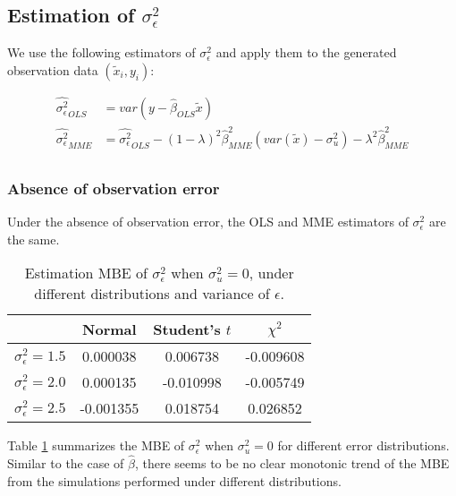 \documentclass{article}
\begin{document}
\subsection{Estimation of $\sigma^2_\epsilon$}

We use the following estimators of $\sigma^2_\epsilon$ and apply them to the generated observation data $(\tilde{x}_i, y_i)$:

\begin{equation}
    \begin{split}
        \hat{\sigma^2_\epsilon}_{OLS} &= var\left(y - \hat{\beta}_{OLS} \tilde{x}\right)\\
        \hat{\sigma^2_\epsilon}_{MME} &= \hat{\sigma^2_\epsilon}_{OLS} -  (1-\lambda)^2 \hat{\beta}_{MME}^2 (var(\tilde{x}) - \sigma^2_u) - \lambda^2 \hat{\beta}_{MME}^2\\
    \end{split}
\end{equation}

\subsubsection{Absence of observation error}

Under the absence of observation error, the OLS and MME estimators of $\sigma^2_\epsilon$ are the same.

\begin{table}[ht]
    \centering
    \caption{Estimation MBE of $\sigma^2_\epsilon$ when $\sigma^2_u=0$, under different distributions and variance of $\epsilon$.}
    \label{Tab:MBE_sigma_absence}
    \begin{tabular}[t]{lccc}
        \hline
        &Normal&Student's $t$&$\chi^2$\\
        \hline
        $\sigma^2_\epsilon = 1.5$&0.000038&0.006738&-0.009608\\
        $\sigma^2_\epsilon = 2.0$&0.000135&-0.010998&-0.005749\\
        $\sigma^2_\epsilon = 2.5$&-0.001355&0.018754& 0.026852\\
        \hline
    \end{tabular}
\end{table}

Table \ref{Tab:MBE_sigma_absence} summarizes the MBE of $\sigma^2_\epsilon$ when $\sigma^2_u=0$ for different error distributions.
Similar to the case of $\hat{\beta}$, there seems to be no clear monotonic trend of the MBE from the simulations performed under different distributions. 
\end{document}
